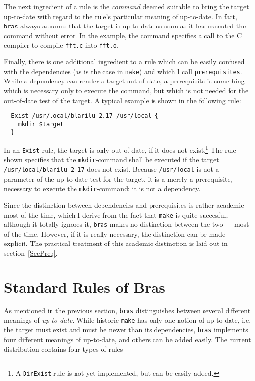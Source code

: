 \documentclass[12pt]{article}
\newcommand{\bras}{\texttt{bras}}
\newcommand{\make}{\texttt{make}}
\begin{document}
The next ingredient of a rule is the \textit{command} deemed suitable
to bring the target up-to-date with regard to the rule's particular
meaning of up-to-date. In fact, \bras{} always assumes that the target
is up-to-date as soon as it has executed the command without error. In
the example, the command specifies a call to the C compiler to compile
\texttt{fft.c} into \texttt{fft.o}.

Finally, there is one additional ingredient to a rule which can be
easily confused with the dependencies (as is the case in \make{}) and
which I call \texttt{prerequisites}. While a dependency can render a
target out-of-date, a prerequisite is something which is necessary only
to execute the command, but which is not needed for the out-of-date
test of the target. A typical example is shown in the following rule:

\begin{verbatim}
  Exist /usr/local/blarilu-2.17 /usr/local {
    mkdir $target
  }
\end{verbatim}

In an \texttt{Exist}-rule, the target is only out-of-date, if it does
not exist.\footnote{A \texttt{DirExist}-rule is not yet implemented,
but can be easily added.} The rule shown specifies that the
\texttt{mkdir}-command shall be executed if the target
\texttt{/usr/local/blarilu-2.17} does not exist.
Because \texttt{/usr/local} is not a
parameter of the up-to-date test for the target, it is a merely a
prerequisite, necessary to execute the \texttt{mkdir}-command; it is
not a dependency.

Since the distinction between dependencies and prerequisites is rather
academic most of the time, which I derive from the fact that \make{}
is quite succesful, although it totally ignores it, \bras{} makes no
distinction between the two --- most of the time. However, if it is
really necessary, the distinction can be made explicit. The practical
treatment of this academic distinction is laid out in
section~\ref{SecPreq}. 


\section{Standard Rules of Bras}

As mentioned in the previous section, \bras{} distinguishes between
several different meanings of \textit{up-to-date}. While historic
\make{} has only one notion of up-to-date, i.e. the target must exist
and must be newer than its dependencies, \bras{} implements four
different meanings of up-to-date, and others can be added easily. The
current distribution contains four types of rules
\end{document}

